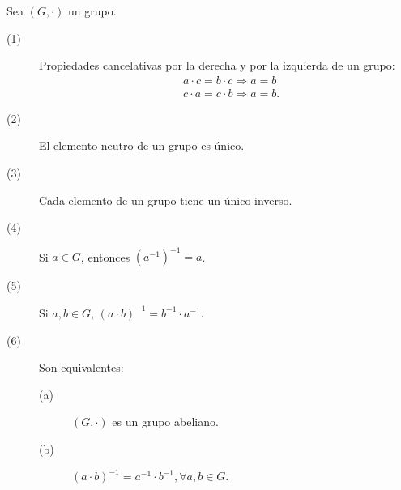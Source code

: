 \begin{fprop}\normalfont Sea $\displaystyle \left(G, \cdot \right) $ un grupo.
\begin{description}
\item[(1)] Propiedades cancelativas por la derecha y por la izquierda de un grupo:
\[
\begin{split}
& a \cdot c = b \cdot c \Rightarrow a = b \\
& c \cdot a = c \cdot b \Rightarrow a = b.
\end{split}
\]
\item[(2)] El elemento neutro de un grupo es único.
\item[(3)] Cada elemento de un grupo tiene un único inverso. 
\item[(4)] Si $\displaystyle a \in G $, entonces $\displaystyle \left(a^{-1}\right)^{-1} = a $.
\item[(5)] Si $\displaystyle a, b \in G $, $\displaystyle \left(a \cdot b\right)^{-1} = b^{-1} \cdot a ^{-1} $. 
\item[(6)] Son equivalentes:
	\begin{description}
	\item[(a)] $\displaystyle \left(G, \cdot\right) $ es un grupo abeliano. 
	\item[(b)] $\displaystyle \left(a \cdot b\right)^{-1} = a^{-1} \cdot b^{-1}, \forall a, b \in G $.
	\end{description}
\end{description}
\end{fprop}


